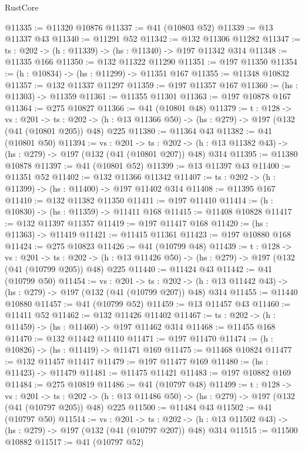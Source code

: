 \begin{lexlean}{RustCore}
\begin{coremodule}
@11335 := @11320 @10876
@11337 := @41 (@10803 @52)
@11339 := @13 @11337 @43
@11340 := @11291 @52
@11342 := @132 @11306 @11282
@11347 := {ts : @202} -> (h : @11339) -> (hs : @11340) -> @197 @11342 @314
@11348 := @11335 @166
@11350 := @132 @11322 @11290
@11351 := @197 @11350
@11354 := (h : @10834) -> (hs : @11299) -> @11351 @167
@11355 := @11348 @10832
@11357 := @132 @11337 @11297
@11359 := @197 @11357 @167
@11360 := (hs : @11303) -> @11359
@11361 := @11355 @11301
@11363 := @197 @10878 @167
@11364 := @275 @10827
@11366 := @41 (@10801 @48)
@11379 := {t : @128} ->
  {vs : @201} ->
  {ts : @202} -> (h : @13 @11366 @50) -> (hs : @279) -> @197 (@132 (@41 (@10801 @205)) @48) @225
@11380 := @11364 @43
@11382 := @41 (@10801 @50)
@11394 := {vs : @201} ->
  {ts : @202} -> (h : @13 @11382 @43) -> (hs : @279) -> @197 (@132 (@41 (@10801 @207)) @48) @314
@11395 := @11380 @10878
@11397 := @41 (@10801 @52)
@11399 := @13 @11397 @43
@11400 := @11351 @52
@11402 := @132 @11366 @11342
@11407 := {ts : @202} -> (h : @11399) -> (hs : @11400) -> @197 @11402 @314
@11408 := @11395 @167
@11410 := @132 @11382 @11350
@11411 := @197 @11410
@11414 := (h : @10830) -> (hs : @11359) -> @11411 @168
@11415 := @11408 @10828
@11417 := @132 @11397 @11357
@11419 := @197 @11417 @168
@11420 := (hs : @11363) -> @11419
@11421 := @11415 @11361
@11423 := @197 @10880 @168
@11424 := @275 @10823
@11426 := @41 (@10799 @48)
@11439 := {t : @128} ->
  {vs : @201} ->
  {ts : @202} -> (h : @13 @11426 @50) -> (hs : @279) -> @197 (@132 (@41 (@10799 @205)) @48) @225
@11440 := @11424 @43
@11442 := @41 (@10799 @50)
@11454 := {vs : @201} ->
  {ts : @202} -> (h : @13 @11442 @43) -> (hs : @279) -> @197 (@132 (@41 (@10799 @207)) @48) @314
@11455 := @11440 @10880
@11457 := @41 (@10799 @52)
@11459 := @13 @11457 @43
@11460 := @11411 @52
@11462 := @132 @11426 @11402
@11467 := {ts : @202} -> (h : @11459) -> (hs : @11460) -> @197 @11462 @314
@11468 := @11455 @168
@11470 := @132 @11442 @11410
@11471 := @197 @11470
@11474 := (h : @10826) -> (hs : @11419) -> @11471 @169
@11475 := @11468 @10824
@11477 := @132 @11457 @11417
@11479 := @197 @11477 @169
@11480 := (hs : @11423) -> @11479
@11481 := @11475 @11421
@11483 := @197 @10882 @169
@11484 := @275 @10819
@11486 := @41 (@10797 @48)
@11499 := {t : @128} ->
  {vs : @201} ->
  {ts : @202} -> (h : @13 @11486 @50) -> (hs : @279) -> @197 (@132 (@41 (@10797 @205)) @48) @225
@11500 := @11484 @43
@11502 := @41 (@10797 @50)
@11514 := {vs : @201} ->
  {ts : @202} -> (h : @13 @11502 @43) -> (hs : @279) -> @197 (@132 (@41 (@10797 @207)) @48) @314
@11515 := @11500 @10882
@11517 := @41 (@10797 @52)

\end{coremodule}
\end{lexlean}
